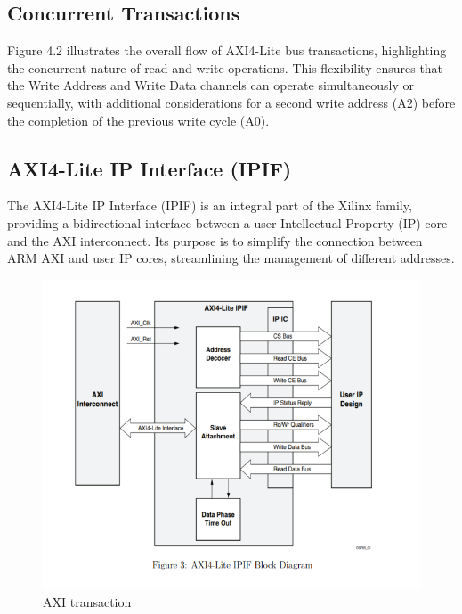 \subsection{ Concurrent Transactions}
Figure 4.2 illustrates the overall flow of AXI4-Lite bus transactions, highlighting the concurrent nature of read and write operations. This flexibility ensures that the Write Address and Write Data channels can operate simultaneously or sequentially, with additional considerations for a second write address (A2) before the completion of the previous write cycle (A0).
\subsection{AXI4-Lite IP Interface (IPIF)} 
The AXI4-Lite IP Interface (IPIF) is an integral part of the Xilinx family, providing a bidirectional interface between a user Intellectual Property (IP) core and the AXI interconnect. Its purpose is to simplify the connection between ARM AXI and user IP cores, streamlining the management of different addresses.

\newpage

\begin{figure}[h] %
  \centering
  \setlength{\abovecaptionskip}{0pt} %
  \setlength{\belowcaptionskip}{0pt} %
  \includegraphics[width=.7\textwidth]{Image/AXI.png} %
  \caption{AXI transaction}
  \label{Figure 1 : RISC-V instruction formats}
\end{figure}


